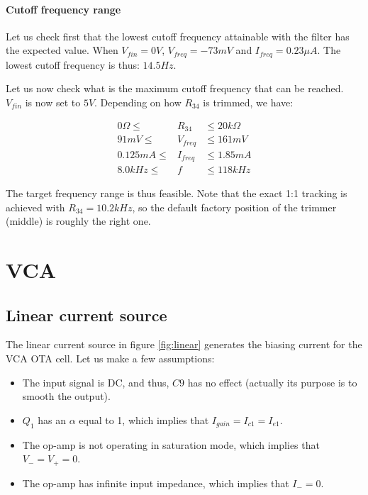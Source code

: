 \documentclass[a4paper,11pt]{article}
\begin{document}
\paragraph{Cutoff frequency range} Let us check first that the lowest cutoff frequency attainable with the filter has the expected value. When $V_{fin} = 0V$, $V_{freq} = -73mV$ and $I_{freq} = 0.23\mu A$. The lowest cutoff frequency is thus: $14.5 Hz$.

Let us now check what is the maximum cutoff frequency that can be reached. $V_{fin}$ is now set to $5V$. Depending on how $R_{34}$ is trimmed, we have:

\begin{eqnarray}
0 \Omega \leq &R_{34}& \leq 20 k\Omega \\
91mV \leq &V_{freq}& \leq 161mV \\
0.125 mA \leq &I_{freq}& \leq 1.85 mA \\
8.0kHz \leq &f& \leq 118kHz
\end{eqnarray}

The target frequency range is thus feasible. Note that the exact 1:1 tracking is achieved with $R_{34} = 10.2 kHz$, so the default factory position of the trimmer (middle) is roughly the right one.

\section{VCA}
\label{sec:vca}

\subsection{Linear current source}

The linear current source in figure \ref{fig:linear} generates the biasing current for the VCA OTA cell. Let us make a few assumptions:
\begin{itemize}
\item The input signal is DC, and thus, $C9$ has no effect (actually its purpose is to smooth the output).
\item $Q_1$ has an $\alpha$ equal to 1, which implies that $I_{gain} = I_{c1} = I_{e1}$.
\item The op-amp is not operating in saturation mode, which implies that $V_- = V_+ = 0$.
\item The op-amp has infinite input impedance, which implies that $I_- = 0$.
\end{itemize}
\end{document}
